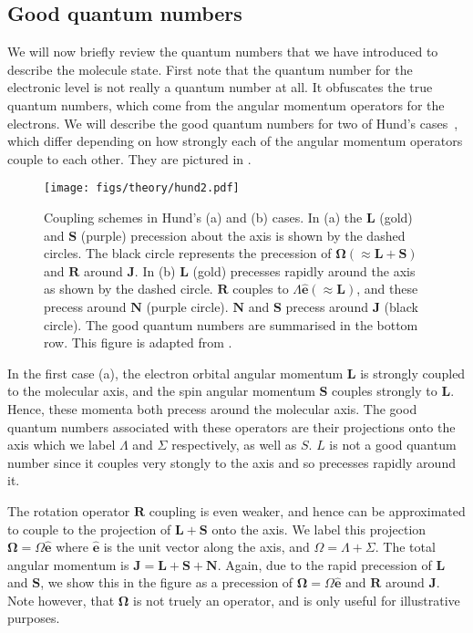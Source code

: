 \subsection{Good quantum numbers}
\label{theory:qnos}

We will now briefly review the quantum numbers that we have introduced to
describe the molecule state. First note that the quantum number for the
electronic level is not really a quantum number at all. It obfuscates the true
quantum numbers, which come from the angular momentum operators for the
electrons. We will describe the good quantum numbers for two of Hund's
cases~\cite{brown_carrington_2003}, which differ depending on how strongly each
of the angular momentum operators couple to each other. They are pictured in
.

\begin{figure}
  \centering
  \texttt{[image: figs/theory/hund2.pdf]}
  \caption{Coupling schemes in Hund's (a) and (b) cases. In (a) the
    $\mathbf{L}$ (gold) and $\mathbf{S}$ (purple) precession about the axis is
    shown by the dashed circles. The black circle represents the precession of
    $\mathbf{\Omega} (\approx\mathbf{L}+\mathbf{S})$ and $\mathbf{R}$ around
    $\mathbf{J}$. In (b) $\mathbf{L}$ (gold) precesses rapidly around the axis
    as shown by the dashed circle. $\mathbf{R}$ couples to
    $\Lambda\mathbf{\mathbf{\hat{e}}}(\approx\mathbf{L})$, and these precess
    around $\mathbf{N}$ (purple circle). $\mathbf{N}$ and $\mathbf{S}$ precess
    around $\mathbf{J}$ (black circle). The good quantum numbers are summarised
    in the bottom row. This figure is adapted from
    .
  }
  \label{theory:fig:hund}
\end{figure}


In the first case (a), the electron orbital angular momentum $\mathbf{L}$ is
strongly coupled to the molecular axis, and the spin angular momentum
$\mathbf{S}$ couples strongly to $\mathbf{L}$. Hence, these momenta both
precess around the molecular axis. The good quantum numbers associated with
these operators are their projections onto the axis which we label $\Lambda$
and $\Sigma$  respectively, as well as $S$. $L$ is not a good quantum number
since it couples very stongly to the axis and so precesses rapidly around it.

The rotation operator $\mathbf{R}$ coupling is even weaker,
and hence can be approximated to couple to the projection of $\mathbf{L} +
\mathbf{S}$ onto the axis. We label this projection $\mathbf{\Omega} = \Omega
\mathbf{\hat{e}}$ where $\mathbf{\hat{e}}$ is the unit vector along the axis,
and $\Omega = \Lambda + \Sigma$. The total angular momentum is $\mathbf{J} =
\mathbf{L} + \mathbf{S} + \mathbf{N}$. Again, due to the rapid precession of
$\mathbf{L}$ and $\mathbf{S}$, we show this in the figure as a precession of
$\mathbf{\Omega} = \Omega\mathbf{\hat{e}}$ and $\mathbf{R}$ around
$\mathbf{J}$. Note however, that $\mathbf{\Omega}$ is not truely an operator,
and is only useful for illustrative purposes.

